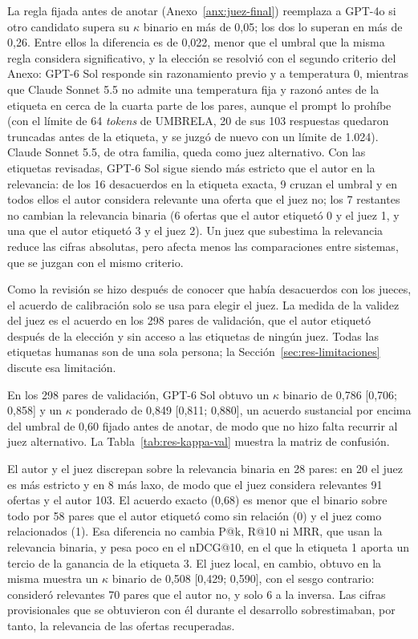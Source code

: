 

La regla fijada antes de anotar (Anexo~\ref{anx:juez-final}) reemplaza a GPT-4o si otro candidato supera su $\kappa$ binario en más de 0,05; los dos lo superan en más de 0,26. Entre ellos la diferencia es de 0,022, menor que el umbral que la misma regla considera significativo, y la elección se resolvió con el segundo criterio del Anexo: GPT-6 Sol responde sin razonamiento previo y a temperatura 0, mientras que Claude Sonnet 5.5 no admite una temperatura fija y razonó antes de la etiqueta en cerca de la cuarta parte de los pares, aunque el prompt lo prohíbe (con el límite de 64 \textit{tokens} de UMBRELA, 20 de sus 103 respuestas quedaron truncadas antes de la etiqueta, y se juzgó de nuevo con un límite de 1.024). Claude Sonnet 5.5, de otra familia, queda como juez alternativo. Con las etiquetas revisadas, GPT-6 Sol sigue siendo más estricto que el autor en la relevancia: de los 16 desacuerdos en la etiqueta exacta, 9 cruzan el umbral y en todos ellos el autor considera relevante una oferta que el juez no; los 7 restantes no cambian la relevancia binaria (6 ofertas que el autor etiquetó 0 y el juez 1, y una que el autor etiquetó 3 y el juez 2). Un juez que subestima la relevancia reduce las cifras absolutas, pero afecta menos las comparaciones entre sistemas, que se juzgan con el mismo criterio.

Como la revisión se hizo después de conocer que había desacuerdos con los jueces, el acuerdo de calibración solo se usa para elegir el juez. La medida de la validez del juez es el acuerdo en los 298 pares de validación, que el autor etiquetó después de la elección y sin acceso a las etiquetas de ningún juez. Todas las etiquetas humanas son de una sola persona; la Sección~\ref{sec:res-limitaciones} discute esa limitación.

En los 298 pares de validación, GPT-6 Sol obtuvo un $\kappa$ binario de 0,786 [0,706; 0,858] y un $\kappa$ ponderado de 0,849 [0,811; 0,880], un acuerdo sustancial por encima del umbral de 0,60 fijado antes de anotar, de modo que no hizo falta recurrir al juez alternativo. La Tabla~\ref{tab:res-kappa-val} muestra la matriz de confusión.



El autor y el juez discrepan sobre la relevancia binaria en 28 pares: en 20 el juez es más estricto y en 8 más laxo, de modo que el juez considera relevantes 91 ofertas y el autor 103. El acuerdo exacto (0,68) es menor que el binario sobre todo por 58 pares que el autor etiquetó como sin relación (0) y el juez como relacionados (1). Esa diferencia no cambia P@k, R@10 ni MRR, que usan la relevancia binaria, y pesa poco en el nDCG@10, en el que la etiqueta 1 aporta un tercio de la ganancia de la etiqueta 3. El juez local, en cambio, obtuvo en la misma muestra un $\kappa$ binario de 0,508 [0,429; 0,590], con el sesgo contrario: consideró relevantes 70 pares que el autor no, y solo 6 a la inversa. Las cifras provisionales que se obtuvieron con él durante el desarrollo sobrestimaban, por tanto, la relevancia de las ofertas recuperadas.

